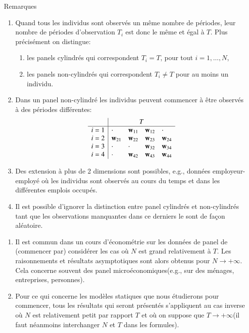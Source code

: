 \begin{frame}[allowframebreaks]{Remarques}
\begin{remark_fr}
\begin{enumerate}[$\star$]
\item Quand tous les individus sont observés un même nombre de périodes, 
leur nombre de périodes d'observation  $T_i$ est donc le même et égal à $T$. Plus précisément on distingue:
\begin{enumerate}[-]
    \item les panels cylindrés qui correspondent $T_i = T$, pour tout $i=1, \ldots, N$,
    \item les panels non-cylindrés qui correspondent $T_i \neq T$ pour au moins un individu.
\end{enumerate}
\item Dans un panel non-cylindré les individus peuvent commencer à être observés à des périodes différentes:
\[
\begin{array}{l|llll}
    &\multicolumn{4}{c}{T}\\
    \hline
i=1&\cdot&\boldw_{11}&\boldw_{12}&\cdot\\
i=2&\boldw_{21}&\boldw_{22}&\boldw_{23}&\boldw_{24}\\
i=3&\cdot&\cdot&\boldw_{32}&\boldw_{34}\\
i=4&\cdot&\boldw_{42}&\boldw_{43}&\boldw_{44}
\end{array}
\]
\item Des extension à plus de 2 dimensions sont possibles, e.g., données employeur-employé où 
les individus sont observés au cours du temps et dans les différentes emplois occupés.
\item Il est possible d'ignorer la distinction entre panel cylindrés et non-cylindrés 
tant que les observations manquantes dans ce derniers le sont de façon aléatoire.
\end{enumerate}
\end{remark_fr}
\framebreak

\begin{remark_fr}
\begin{enumerate}[$\star$]
    \item Il est commun dans un cours d'économétrie sur les données de panel de (commencer par) 
    considérer les cas où $N$ est grand relativement à $T$. Les raisonnements et résultats asymptotiques sont 
    alors obtenus pour $N\rightarrow +\infty$. Cela concerne souvent des panel microéconomiques(e.g., 
    sur des ménages, entreprises, personnes).
    \item Pour ce qui concerne les modèles statiques que nous étudierons pour commencer, 
    tous les résultats qui seront présentés s'appliquent au cas inverse où $N$ est relativement petit 
    par rapport $T$ et où on suppose que $T\rightarrow +\infty$(il faut néanmoins interchanger $N$ et $T$ dans les formules).
\end{enumerate}
\end{remark_fr}


\end{frame}
